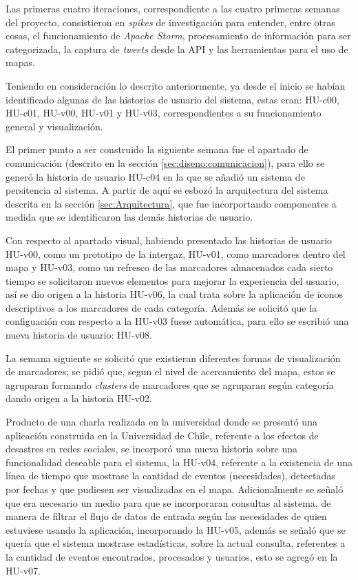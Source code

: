 Las primeras cuatro iteraciones, correspondiente a las cuatro primeras semanas del proyecto, consistieron en \textit{spikes} de investigación para entender, entre otras cosas, el funcionamiento de \textit{Apache Storm}, procesamiento de información para ser categorizada, la captura de \textit{tweets} desde la API y las herramientas para el uso de mapas. 

Teniendo en consideración lo descrito anteriormente, ya desde el inicio se habían identificado algunas de las historias de usuario del sistema, estas eran: HU-c00, HU-c01, HU-v00, HU-v01 y HU-v03, correspondientes a su funcionamiento general y visualización.

El primer punto a ser construido la siguiente semana fue el apartado de comunicación (descrito en la sección \ref{sec:diseno:comunicacion}), para ello se generó la historia de usuario HU-c04 en la que se añadió un sistema de persitencia al sistema. A partir de aquí se esbozó la arquitectura del sistema descrita en la sección \ref{sec:Arquitectura}, que fue incorportando componentes a medida que se identificaron las demás historias de usuario.

Con respecto al apartado visual, habiendo presentado las historias de usuario HU-v00, como un prototipo de la intergaz, HU-v01, como marcadores dentro del mapa y HU-v03, como un refresco de las marcadores almacenados cada sierto tiempo se solicitaron nuevos elementos para mejorar la experiencia del usuario, así se dio origen a la historia HU-v06, la cual trata sobre la aplicación de iconos descriptivos a los marcadores de cada categoría. Además se solicitó que la configuación con respecto a la HU-v03 fuese automática, para ello se escribió una nueva historia de usuario: HU-v08.

La semana siguiente se solicitó que existieran diferentes formas de visualización de marcadores; se pidió que, segun el nivel de acercamiento del mapa, estos se agruparan formando \textit{clusters} de marcadores que se agruparan según categoría dando origen a la historia HU-v02.

Producto de una charla realizada en la universidad donde se presentó una aplicación construida en la Universidad de Chile, referente a los efectos de desastres en redes sociales, se incorporó una nueva historia sobre una funcionalidad deseable para el sistema, la HU-v04, referente a la existencia de una línea de tiempo que mostrase la cantidad de eventos (necesidades), detectadas por fechas y que pudiesen ser visualizadas en el mapa. Adicionalmente se señaló que era necesario un medio para que se incorporaran consultas al sistema, de manera de filtrar el flujo de datos de entrada según las necesidades de quien estuviese usando la aplicación, incorporando la HU-v05, además se señaló que se quería que el sistema mostrase estadísticas, sobre la actual consulta, referentes a la cantidad de eventos encontrados, procesados y usuarios, esto se agregó en la HU-v07.

